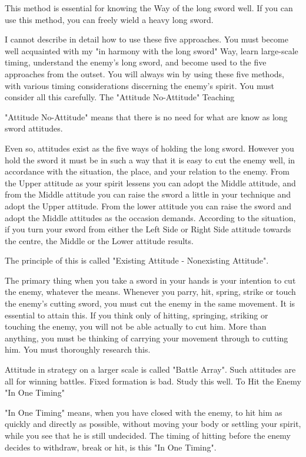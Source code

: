 This method is essential for knowing the Way of the long sword well. If you can use this method, you can freely wield a heavy long sword.

I cannot describe in detail how to use these five approaches. You must become well acquainted with my "in harmony with the long sword" Way, learn large-scale timing, understand the enemy's long sword, and become used to the five approaches from the outset. You will always win by using these five methods, with various timing considerations discerning the enemy's spirit. You must consider all this carefully.
The "Attitude No-Attitude" Teaching

"Attitude No-Attitude" means that there is no need for what are know as long sword attitudes.

Even so, attitudes exist as the five ways of holding the long sword. However you hold the sword it must be in such a way that it is easy to cut the enemy well, in accordance with the situation, the place, and your relation to the enemy. From the Upper attitude as your spirit lessens you can adopt the Middle attitude, and from the Middle attitude you can raise the sword a little in your technique and adopt the Upper attitude. From the lower attitude you can raise the sword and adopt the Middle attitudes as the occasion demands. According to the situation, if you turn your sword from either the Left Side or Right Side attitude towards the centre, the Middle or the Lower attitude results.

The principle of this is called "Existing Attitude - Nonexisting Attitude".

The primary thing when you take a sword in your hands is your intention to cut the enemy, whatever the means. Whenever you parry, hit, spring, strike or touch the enemy's cutting sword, you must cut the enemy in the same movement. It is essential to attain this. If you think only of hitting, springing, striking or touching the enemy, you will not be able actually to cut him. More than anything, you must be thinking of carrying your movement through to cutting him. You must thoroughly research this.

Attitude in strategy on a larger scale is called "Battle Array". Such attitudes are all for winning battles. Fixed formation is bad. Study this well.
To Hit the Enemy "In One Timing"

"In One Timing" means, when you have closed with the enemy, to hit him as quickly and directly as possible, without moving your body or settling your spirit, while you see that he is still undecided. The timing of hitting before the enemy decides to withdraw, break or hit, is this "In One Timing".

